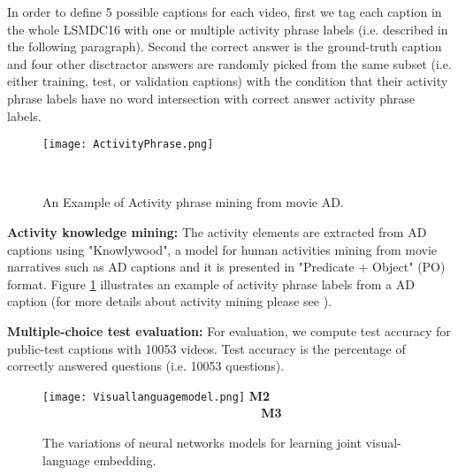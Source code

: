 \documentclass[runningheads]{llncs}
\begin{document}
\noindent
In order to define 5 possible captions for each video, first we tag each caption in the whole LSMDC16 with one or multiple activity phrase labels (i.e. described in the following paragraph). Second the correct answer is the ground-truth caption and four other disctractor answers are randomly picked from the same subset (i.e. either training, test, or validation captions) with the condition that their activity phrase labels have no word intersection with correct answer activity phrase labels.

\begin{figure}[ht]
\begin{center}
\texttt{[image: ActivityPhrase.png]}
\end{center}
\vspace{-0.2in}
   \caption{ An Example of Activity phrase mining from movie AD.}
\label{overview}
\label{fig:Activityphrase}\
\vspace{-0.2in}
\end{figure}

\noindent
{\bf Activity knowledge mining:} The activity elements
are extracted from AD captions using "Knowlywood", a model for human activities mining from movie narratives such as AD captions \cite{Tandon2015Knowlywood} and it is presented in "Predicate + Object" (PO) format. Figure \ref{fig:Activityphrase} illustrates an example of activity phrase labels from a AD caption (for more details about activity mining please see \cite{Tandon2015Knowlywood}).

\noindent
{\bf Multiple-choice test evaluation:} For evaluation, we compute test accuracy for public-test captions with 10053 videos. Test accuracy is the percentage of correctly answered questions (i.e. 10053 questions).




\begin{figure}[]
\begin{center}
\texttt{[image: Visuallanguagemodel.png]} 
    \textbf{M2}  ~~~~~~~~~~~~~~~~~  ~~~~~~~~~~~~~~~~~ ~~~~~~~~~~~~~~~~~ \textbf{M3}  ~~~~~~~~~~~~~
\end{center}
\vspace{-0.1in}
   \caption{The variations of neural networks models for learning joint visual-language embedding.}
\vspace{-0.5in}
\label{Arc}   
\end{figure}
\end{document}
